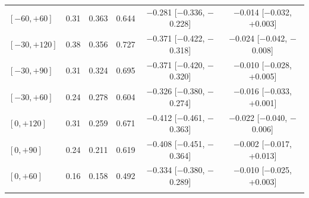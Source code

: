 \begin{table}[tbp]
\begin{tabular*}{\textwidth}{@{\extracolsep\fill}lccccc}
$[{-}60,+60]$ & 0.31 & 0.363 & 0.644 & $-$0.281 [$-$0.336, $-$0.228] & $-$0.014 [$-$0.032, +0.003] \\
$[{-}30,+120]$ & 0.38 & 0.356 & 0.727 & $-$0.371 [$-$0.422, $-$0.318] & $-$0.024 [$-$0.042, $-$0.008] \\
$[{-}30,+90]$ & 0.31 & 0.324 & 0.695 & $-$0.371 [$-$0.420, $-$0.320] & $-$0.010 [$-$0.028, +0.005] \\
$[{-}30,+60]$ & 0.24 & 0.278 & 0.604 & $-$0.326 [$-$0.380, $-$0.274] & $-$0.016 [$-$0.033, +0.001] \\
$[0,+120]$ & 0.31 & 0.259 & 0.671 & $-$0.412 [$-$0.461, $-$0.363] & $-$0.022 [$-$0.040, $-$0.006] \\
$[0,+90]$ & 0.24 & 0.211 & 0.619 & $-$0.408 [$-$0.451, $-$0.364] & $-$0.002 [$-$0.017, +0.013] \\
$[0,+60]$ & 0.16 & 0.158 & 0.492 & $-$0.334 [$-$0.380, $-$0.289] & $-$0.010 [$-$0.025, +0.003] \\
\botrule
\end{tabular*}
\end{table}
